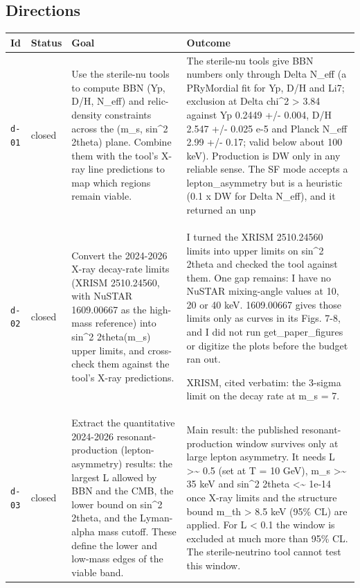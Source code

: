 \documentclass[11pt,a4paper]{article}
\begin{document}
\subsection{Directions}
\begin{longtable}{@{}p{}p{}p{}p{}@{}}
\toprule Id & Status & Goal & Outcome \\ \midrule \endhead
\texttt{d-01} & closed & Use the sterile-nu tools to compute BBN (Yp, D/H, N\_eff) and relic-density constraints across the (m\_s, sin\textasciicircum{}2 2theta) plane. Combine them with the tool's X-ray line predictions to map which regions remain viable. & The sterile-nu tools give BBN numbers only through Delta N\_eff (a PRyMordial fit for Yp, D/H and Li7; exclusion at Delta chi\textasciicircum{}2 \textgreater{} 3.84 against Yp 0.2449 +/- 0.004, D/H 2.547 +/- 0.025 e-5 and Planck N\_eff 2.99 +/- 0.17; valid below about 100 keV). Production is DW only in any reliable sense. The SF mode accepts a lepton\_asymmetry but is a heuristic (0.1 x DW for Delta N\_eff), and it returned an unp \\
\texttt{d-02} & closed & Convert the 2024-2026 X-ray decay-rate limits (XRISM 2510.24560, with NuSTAR 1609.00667 as the high-mass reference) into sin\textasciicircum{}2 2theta(m\_s) upper limits, and cross-check them against the tool's X-ray predictions. & I turned the XRISM 2510.24560 limits into upper limits on sin\textasciicircum{}2 2theta and checked the tool against them. One gap remains: I have no NuSTAR mixing-angle values at 10, 20 or 40 keV. 1609.00667 gives those limits only as curves in its Figs. 7-8, and I did not run get\_paper\_figures or digitize the plots before the budget ran out.

XRISM, cited verbatim: the 3-sigma limit on the decay rate at m\_s = 7. \\
\texttt{d-03} & closed & Extract the quantitative 2024-2026 resonant-production (lepton-asymmetry) results: the largest L allowed by BBN and the CMB, the lower bound on sin\textasciicircum{}2 2theta, and the Lyman-alpha mass cutoff. These define the lower and low-mass edges of the viable band. & Main result: the published resonant-production window survives only at large lepton asymmetry. It needs L \textgreater{}\textasciitilde{} 0.5 (set at T = 10 GeV), m\_s \textgreater{}\textasciitilde{} 35 keV and sin\textasciicircum{}2 2theta \textless{}\textasciitilde{} 1e-14 once X-ray limits and the structure bound m\_th \textgreater{} 8.5 keV (95\% CL) are applied. For L \textless{} 0.1 the window is excluded at much more than 95\% CL. The sterile-neutrino tool cannot test this window.


\end{longtable}
\end{document}
